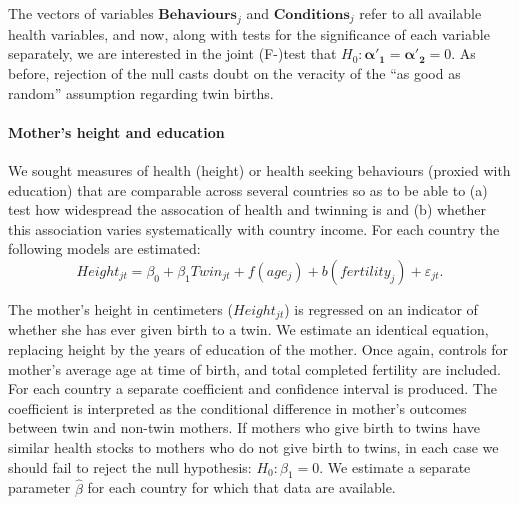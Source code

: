 \documentclass[11pt]{article}
\begin{document}
The vectors of variables $\bm{Behaviours}_j$ and $\bm{Conditions}_j$ refer to all available health variables, and now, along with tests for the significance of each variable separately, we are interested in the joint (F-)test that $H_0:\bm{\alpha'_1}=\bm{\alpha'_2}=0$.  As before, rejection of the null casts doubt on the veracity of the ``as good as random'' assumption regarding twin births.

\paragraph{Mother's height and education}
We sought measures of health (height) or health seeking behaviours (proxied with education) that are comparable across several countries so as to be able to (a) test how widespread the assocation of health and twinning is and (b) whether this association varies systematically with country income. For each country the following models are estimated:
\begin{equation}
  \label{height}
  Height_{jt}=\beta_0 + \beta_1 Twin_{jt} + f(age_j) + b(fertility_j) + \varepsilon_{jt}.
\end{equation}

The mother's height in centimeters ($Height_{jt}$) is regressed on an indicator of whether she has ever given birth to a twin. We estimate an identical equation, replacing height by the years of education of the mother.  Once again, controls for mother's average age at time of birth, and total completed fertility are included.  For each country a separate coefficient and confidence interval is produced.  The coefficient is interpreted as the conditional difference in mother's outcomes between twin and non-twin mothers.  If mothers who give birth to twins have similar health stocks to mothers who do not give birth to twins, in each case we should fail to reject the null hypothesis: $H_0: \beta_1=0$. We estimate a separate parameter $\hat\beta$ for each country for which that data are available.
\end{document}
